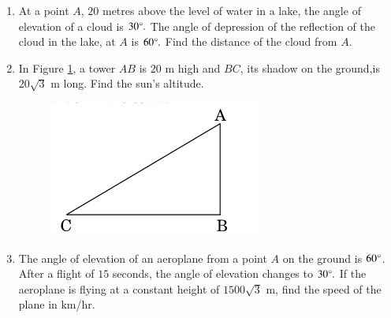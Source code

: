 \begin{enumerate}
\item At a point $A$, $20$ metres above the level of water in a lake, the angle of elevation of a cloud is $30 \degree.$ The angle of depression of the reflection of the cloud in the lake, at $A$ is $60\degree .$ Find the distance of the cloud from $A$.
\item In Figure \ref{Figure 1}, a tower $AB$ is $20$ m high and $BC$, its shadow on the ground,is $20\sqrt{3}$ m long. Find the sun's altitude.
\begin{figure}[h!]
	\centering
    \includegraphics[width=\columnwidth]{figs/cbse_30_3_1.png}
	\label{Figure 1}
\end{figure}
\item The angle of elevation of an aeroplane from a point $A$ on the ground is $60 \degree  $. After a flight of $15$ seconds, the angle of elevation changes to $  30 \degree.$ If the aeroplane is flying at a constant height of $1500\sqrt{3}$ m, find the speed of the plane in km/hr.

\end{enumerate}
